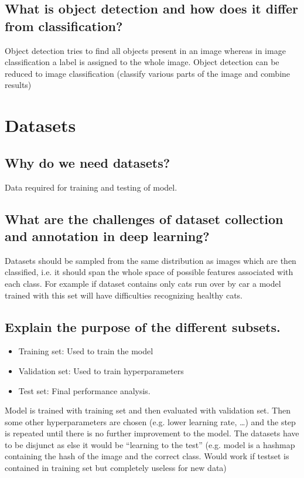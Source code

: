 \subsection{What is object detection and how does it differ from classification?}
Object detection tries to find all objects present in an image whereas in image classification a label is assigned to the whole image. Object detection can be reduced to image classification (classify various parts of the image and combine results)

\section{Datasets}

\subsection{Why do we need datasets?}Data required for training and testing of model. 
	
\subsection{What are the challenges of dataset collection and annotation in deep learning?}Datasets should be sampled from the same distribution as images which are then classified, i.e. it should span the whole space of possible features associated with each class. For example if dataset contains only cats run over by car a model trained with this set will have difficulties recognizing healthy cats.

\subsection{Explain the purpose of the different subsets.}
\begin{itemize}
\item Training set: Used to train the model
\item Validation set: Used to train hyperparameters
\item Test set: Final performance analysis. 
\end{itemize}
Model is trained with training set and then evaluated with validation set. Then some other hyperparameters are chosen (e.g. lower learning rate, \ldots) and the step is repeated until there is no further improvement to the model. The datasets have to be disjunct as else it would be ``learning to the test'' (e.g. model is a hashmap containing the hash of the image and the correct class. Would work if testset is contained in training set but completely useless for new data)

